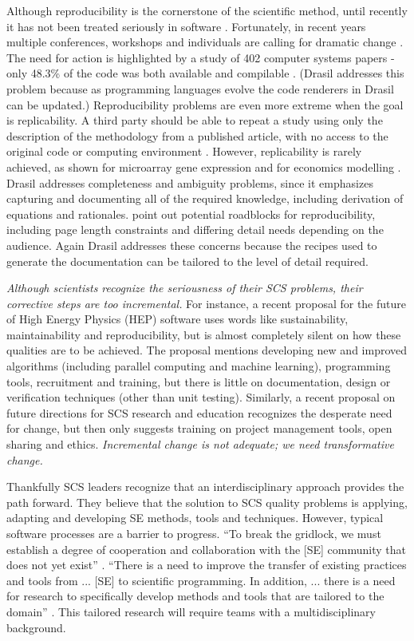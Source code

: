 \documentclass[12pt]{article}
\begin{document}
Although reproducibility is the cornerstone of the scientific method, until
recently it has not been treated seriously in software
\citep{BenureauAndRougier2017}.  Fortunately, in recent years multiple
conferences, workshops and individuals are calling for dramatic change
\citep{BaileyEtAl2016}.  The need for action is highlighted by a study of 402
computer systems papers - only 48.3\% of the code was both available and
compilable \citep{CollbergEtAl2015}.  (Drasil addresses this problem because as
programming languages evolve the code renderers in Drasil can be updated.)
Reproducibility problems are even more extreme when the goal is replicability.
A third party should be able to repeat a study using only the description of the
methodology from a published article, with no access to the original code or
computing environment \citep{BenureauAndRougier2017}.  However, replicability is
rarely achieved, as shown for microarray gene expression
\citep{IoannidisEtAl2009} and for economics modelling
\citep{IonescuAndJansson2013}.  Drasil addresses completeness and ambiguity
problems, since it emphasizes capturing and documenting all of the required
knowledge, including derivation of equations and
rationales. \citet{CrickAndHall2014} point out potential roadblocks for
reproducibility, including page length constraints and differing detail needs
depending on the audience.  Again Drasil addresses these concerns because the
recipes used to generate the documentation can be tailored to the level of
detail required.

\emph{Although scientists recognize the seriousness of their SCS problems, their
  corrective steps are too incremental.}  For instance, a recent proposal for
the future of High Energy Physics (HEP) software \cite{StewartEtAl2017} uses
words like sustainability, maintainability and reproducibility, but is almost
completely silent on how these qualities are to be achieved.  The proposal
mentions developing new and improved algorithms (including parallel computing
and machine learning), programming tools, recruitment and training, but there is
little on documentation, design or verification techniques (other than unit
testing).  Similarly, a recent proposal on future directions for SCS research
and education \citep{RudeEtAl2018} recognizes the desperate need for change, but
then only suggests training on project management tools, open sharing and
ethics.  \emph{Incremental change is not adequate; we need transformative
  change.}

Thankfully SCS leaders recognize that an interdisciplinary approach provides the
path forward.  They believe that the solution to SCS quality problems is
applying, adapting and developing SE methods, tools and techniques.  However,
typical software processes are a barrier to progress.  ``To break the gridlock,
we must establish a degree of cooperation and collaboration with the [SE]
community that does not yet exist'' \citep{FaulkEtAl2009}.  ``There is a need to
improve the transfer of existing practices and tools from ... [SE] to scientific
programming. In addition, ... there is a need for research to specifically
develop methods and tools that are tailored to the domain'' \citep{Storer2017}.
This tailored research will require teams with a multidisciplinary background.
\end{document}
